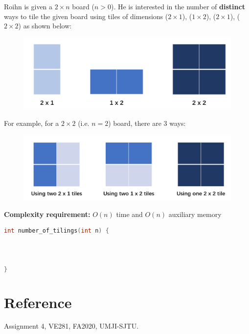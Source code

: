 \documentclass[11pt]{exam}
\begin{document}
Roihn is given a $2\times n$ board ($n>0$). He is interested in the number of \textbf{distinct} ways to tile the given board using tiles of dimensions ($2\times 1$), ($1\times 2$), ($2\times 1$), ($2\times 2$) as shown below:
\begin{figure}[H]
\centering
\includegraphics[width=.7\linewidth]{tile.png}
\end{figure}
For example, for a $2\times 2$ (i.e. $n=2$) board, there are 3 ways:
\begin{figure}[H]
\centering
\includegraphics[width=.8\linewidth]{tile2x2.png}
\end{figure}

\textbf{Complexity requirement:} $O(n)$ time and $O(n)$ auxiliary memory

\begin{solution}
\begin{lstlisting}[language=c++]
int number_of_tilings(int n) {



}
\end{lstlisting}
\end{solution}
\section*{Reference}
Assignment 4, VE281, FA2020, UMJI-SJTU.
\end{document}
